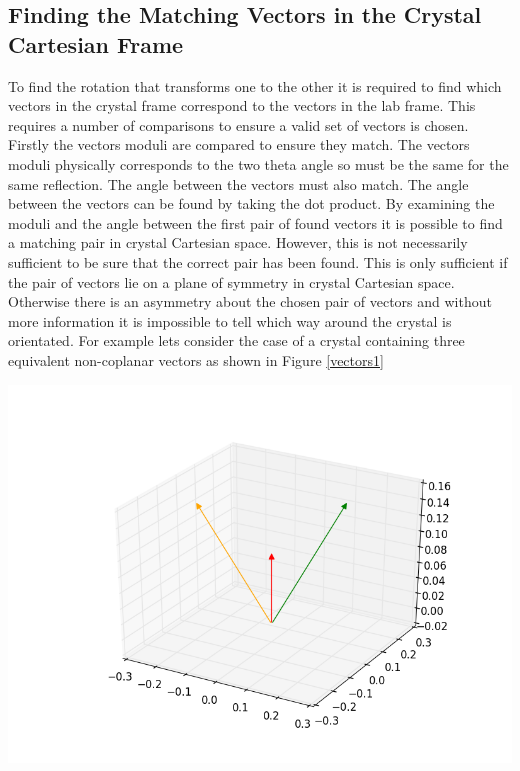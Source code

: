 \documentclass[10pt,a4paper]{article}
\begin{document}
\begin{multicols}{2}
\subsection*{Finding the Matching Vectors in the Crystal Cartesian Frame}
To find the rotation that transforms one to the other it is required to find which vectors in the crystal frame correspond to the vectors in the lab frame. This requires a number of comparisons to ensure a valid set of vectors is chosen. Firstly the vectors moduli are compared to ensure they match. The vectors moduli physically corresponds to the two theta angle so must be the same for the same reflection. The angle between the vectors must also match. The angle between the vectors can be found by taking the dot product. By examining the moduli and the angle between the first pair of found vectors it is possible to find a matching pair in crystal Cartesian space. However, this is not necessarily sufficient to be sure that the correct pair has been found. This is only sufficient if the pair of vectors lie on a plane of symmetry in crystal Cartesian space. Otherwise there is an asymmetry about the chosen pair of vectors and without more information it is impossible to tell which way around the crystal is orientated. %
For example lets consider the case of a crystal containing three equivalent non-coplanar vectors as shown in Figure \ref{vectors1}
\begin{center}
\includegraphics [width=\columnwidth]{three_vectors.png}
\label{vectors1}
\end{center}

\end{multicols}
\end{document}
